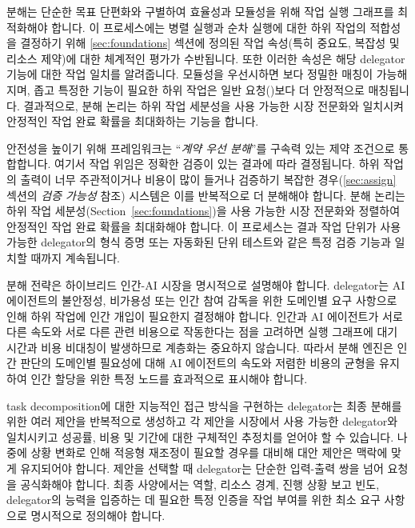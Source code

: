 \documentclass[11pt, a4paper, twocolumn, copyright, goog]{google}
\begin{document}
분해는 단순한 목표 단편화와 구별하여 효율성과 모듈성을 위해 작업 실행 그래프를 최적화해야 합니다.  이 프로세스에는 병렬 실행과 순차 실행에 대한 하위 작업의 적합성을 결정하기 위해 \ref{sec:foundations} 섹션에 정의된 작업 속성(특히 중요도, 복잡성 및 리소스 제약)에 대한 체계적인 평가가 수반됩니다. 또한 이러한 속성은 해당 delegator 기능에 대한 작업 일치를 알려줍니다. 모듈성을 우선시하면 보다 정밀한 매칭이 가능해지며, 좁고 특정한 기능이 필요한 하위 작업은 일반 요청(\citep{khattab2023dspycompilingdeclarativelanguage})보다 더 안정적으로 매칭됩니다. 결과적으로, 분해 논리는 하위 작업 세분성을 사용 가능한 시장 전문화와 일치시켜 안정적인 작업 완료 확률을 최대화하는 기능을 합니다.

안전성을 높이기 위해 프레임워크는 ``\emph{계약 우선 분해}''를 구속력 있는 제약 조건으로 통합합니다. 여기서 작업 위임은 정확한 검증이 있는 결과에 따라 결정됩니다. 하위 작업의 출력이 너무 주관적이거나 비용이 많이 들거나 검증하기 복잡한 경우(\ref{sec:assign} 섹션의 \textit{검증 가능성} 참조) 시스템은 이를 반복적으로 더 분해해야 합니다. 분해 논리는 하위 작업 세분성(Section~\ref{sec:foundations})을 사용 가능한 시장 전문화와 정렬하여 안정적인 작업 완료 확률을 최대화해야 합니다. 이 프로세스는 결과 작업 단위가 사용 가능한 delegator의 형식 증명 또는 자동화된 단위 테스트와 같은 특정 검증 기능과 일치할 때까지 계속됩니다.

분해 전략은 하이브리드 인간-AI 시장을 명시적으로 설명해야 합니다. delegator는 AI 에이전트의 불안정성, 비가용성 또는 인간 참여 감독을 위한 도메인별 요구 사항으로 인해 하위 작업에 인간 개입이 필요한지 결정해야 합니다. 인간과 AI 에이전트가 서로 다른 속도와 서로 다른 관련 비용으로 작동한다는 점을 고려하면 실행 그래프에 대기 시간과 비용 비대칭이 발생하므로 계층화는 중요하지 않습니다. 따라서 분해 엔진은 인간 판단의 도메인별 필요성에 대해 AI 에이전트의 속도와 저렴한 비용의 균형을 유지하여 인간 할당을 위한 특정 노드를 효과적으로 표시해야 합니다.

task decomposition에 대한 지능적인 접근 방식을 구현하는 delegator는 최종 분해를 위한 여러 제안을 반복적으로 생성하고 각 제안을 시장에서 사용 가능한 delegator와 일치시키고 성공률, 비용 및 기간에 대한 구체적인 추정치를 얻어야 할 수 있습니다. 나중에 상황 변화로 인해 적응형 재조정이 필요할 경우를 대비해 대안 제안은 맥락에 맞게 유지되어야 합니다. 제안을 선택할 때 delegator는 단순한 입력-출력 쌍을 넘어 요청을 공식화해야 합니다. 최종 사양에서는 역할, 리소스 경계, 진행 상황 보고 빈도, delegator의 능력을 입증하는 데 필요한 특정 인증을 작업 부여를 위한 최소 요구 사항으로 명시적으로 정의해야 합니다.
\end{document}
